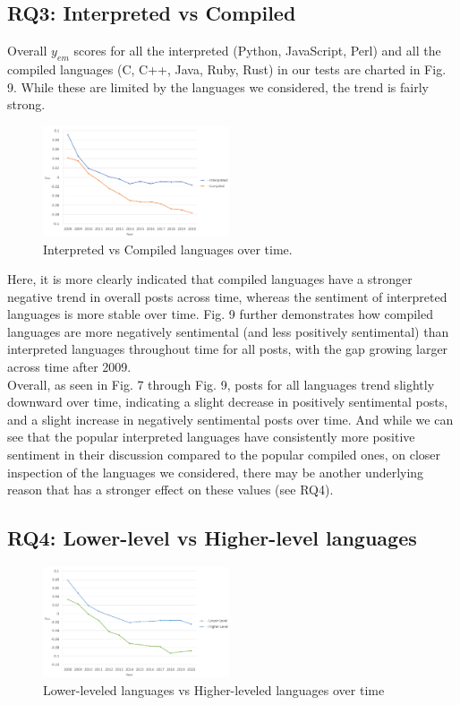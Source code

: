 \documentclass[conference]{IEEEtran}
\begin{document}
\subsection{RQ3: Interpreted vs Compiled}
Overall $y_{em}$ scores for all the interpreted (Python, JavaScript, Perl) and all the compiled languages (C, C++, Java, Ruby, Rust) in our tests are charted in Fig. 9. While these are limited by the languages we considered, the trend is fairly strong. \\

\begin{figure}[htbp]
\centerline{\includegraphics[width=0.49\textwidth]{figures/time_interpreted_compiled.png}}
\caption{Interpreted vs Compiled languages over time.}
\label{fig}
\end{figure}

Here, it is more clearly indicated that compiled languages have a stronger negative trend in overall posts across time, whereas the sentiment of interpreted languages is more stable over time. Fig. 9 further demonstrates how compiled languages are more negatively sentimental (and less positively sentimental) than interpreted languages throughout time for all posts, with the gap growing larger across time after 2009. \\

Overall, as seen in Fig. 7 through Fig. 9, posts for all languages trend slightly downward over time, indicating a slight decrease in positively sentimental posts, and a slight increase in negatively sentimental posts over time. And while we can see that the popular interpreted languages have consistently more positive sentiment in their discussion compared to the popular compiled ones, on closer inspection of the languages we considered, there may be another underlying reason that has a stronger effect on these values (see RQ4). \\

\subsection{RQ4: Lower-level vs Higher-level languages}
\begin{figure}[htbp]
\centerline{\includegraphics[width=0.49\textwidth]{figures/time_lower_higher.png}}
\caption{Lower-leveled languages vs Higher-leveled languages over time}
\label{fig}
\end{figure}
\end{document}
